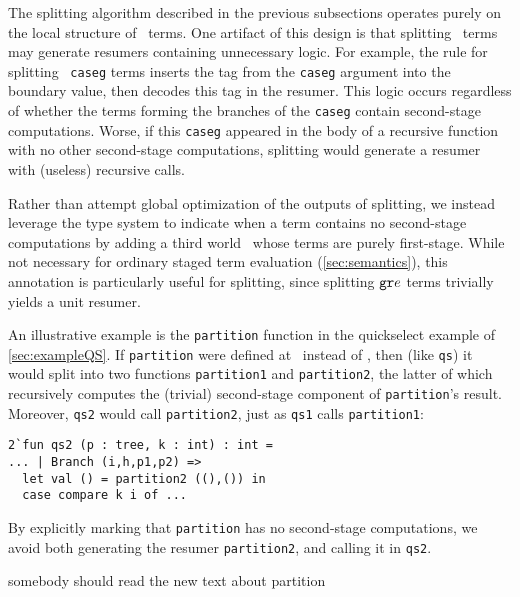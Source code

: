 \begin{abstrsyn}
The splitting algorithm described in the previous subsections operates
purely on the local structure of \lang\ terms.  One artifact of this design
is that splitting \bbonem\ terms may generate resumers containing
unnecessary logic.  For example, the rule for splitting
\bbonem\ \texttt{caseg} terms inserts the tag from the \texttt{caseg}
argument into the boundary value, then decodes this tag in the
resumer. This logic occurs regardless of whether the terms forming the
branches of the \texttt{caseg} contain second-stage computations.
Worse, if this \texttt{caseg} appeared in the body of a recursive
function with no other second-stage computations, splitting would
generate a resumer with (useless) recursive calls.

Rather than attempt global optimization of the outputs of splitting,
we instead leverage the type system to indicate when a term contains
no second-stage computations by adding a third world \bbonep\ whose
terms are purely first-stage.  While not necessary for ordinary staged
term evaluation (\ref{sec:semantics}), this annotation is
particularly useful for splitting, since splitting ${\tt gr} e$
terms trivially yields a unit resumer.

An illustrative example is the \texttt{partition} function in the quickselect
example of \ref{sec:exampleQS}. If \texttt{partition} were defined at \bbonem\
instead of \bbonep, then (like \texttt{qs}) it would split into two functions
\texttt{partition1} and \texttt{partition2}, the latter of which recursively
computes the (trivial) second-stage component of \texttt{partition}'s result.
Moreover, \texttt{qs2} would call \texttt{partition2}, just as \texttt{qs1}
calls \texttt{partition1}:
\begin{lstlisting}
2`fun qs2 (p : tree, k : int) : int =
... | Branch (i,h,p1,p2) =>
  let val () = partition2 ((),()) in
  case compare k i of ...
\end{lstlisting}
By explicitly marking that \texttt{partition} has no second-stage computations,
we avoid both generating the resumer \texttt{partition2}, and calling it in
\texttt{qs2}.


\TODO somebody should read the new text about partition

\end{abstrsyn}



